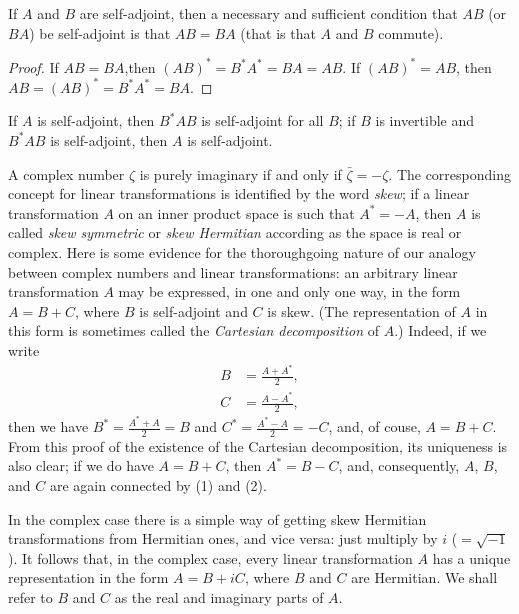 \begin{theorem}
    If \(A\) and \(B\) are self-adjoint, then a necessary and sufficient condition that \(AB\) (or \(BA\)) be self-adjoint is that \(AB = BA\) (that is that \(A\) and \(B\) commute).
\end{theorem}

\begin{proof}
    If \(AB = BA\),then \((AB)^* = B^*A^* = BA = AB\). If \((AB)^* = AB\), then \(AB = (AB)^* = B^*A^* = BA\).
\end{proof}

\begin{theorem}
    If \(A\) is self-adjoint, then \(B^*AB\) is self-adjoint for all \(B\); if \(B\) is invertible and \(B^*AB\) is self-adjoint, then \(A\) is self-adjoint.
\end{theorem}

A complex number \(\zeta\) is purely imaginary if and only if \(\bar{\zeta} =
-\zeta\). The corresponding concept for linear transformations is identified by
the word \emph{skew}; if a linear transformation \(A\) on an inner product space
is such that \(A^* = -A\), then \(A\) is called \emph{skew symmetric} or
\emph{skew Hermitian} according as the space is real or complex. Here is some
evidence for the thoroughgoing nature of our analogy between complex numbers and
linear transformations: an arbitrary linear transformation \(A\) may be
expressed, in one and only one way, in the form \(A = B + C\), where \(B\) is
self-adjoint and \(C\) is skew. (The representation of \(A\) in this form is
sometimes called the \emph{Cartesian decomposition} of \(A\).) Indeed, if we
write
\begin{align}
    B &= \frac{A + A^*}{2},\\
    C &= \frac{A - A^*}{2},
\end{align}
then we have \(\displaystyle B^* = \frac{A^* + A}{2}  = B\) and \(\displaystyle
C^* = \frac{A^* - A}{2} = -C\), and, of couse, \(A = B + C\). From this proof of
the existence of the Cartesian decomposition, its uniqueness is also clear; if
we do have \(A = B + C\), then \(A^* = B- C\), and, consequently, \(A\), \(B\),
and \(C\) are again connected by (1) and (2).

In the complex case there is a simple way of getting skew Hermitian
transformations from Hermitian ones, and vice versa: just multiply by \(i\)
(\(=\sqrt{-1}\)). It follows that, in the complex case, every linear
transformation \(A\) has a unique representation in the form \(A = B + iC\),
where \(B\) and \(C\) are Hermitian. We shall refer to \(B\) and \(C\) as the
real and imaginary parts of \(A\).

